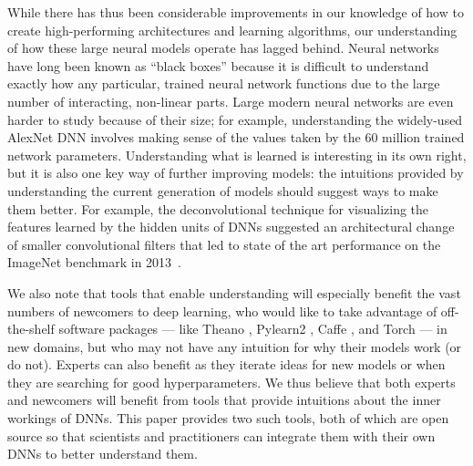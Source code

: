 \documentclass{article}
\begin{document}

While there has thus been considerable improvements in our knowledge of how to create high-performing architectures and learning algorithms, our understanding of how these large neural models operate has lagged behind. Neural networks have long been known as ``black boxes'' because it is difficult to understand exactly how any particular, trained neural network functions due to the large number of interacting, non-linear parts. Large modern neural networks are even harder to study because of their size; for example, understanding the widely-used AlexNet DNN involves making sense of the values taken by the 60 million trained network parameters. Understanding what is learned is interesting in its own right, but it is also one key way of further improving models: the intuitions provided by understanding the current generation of models should suggest ways to make them better. For example, the deconvolutional technique for visualizing the features learned by the hidden units of DNNs suggested an architectural change of smaller convolutional filters that led to state of the art performance on the ImageNet benchmark in 2013~\cite{zeiler2013visualizing-and-understanding-convolutional}.

We also note that tools that enable understanding will especially benefit the vast numbers of newcomers to deep learning, who would like to take advantage of off-the-shelf software packages --- like Theano \cite{bergstra2010theano:-a-cpu-and-gpu-math-expression}, Pylearn2 \cite{goodfellow2013pylearn2:-a-machine-learning-research}, Caffe \cite{jia2014caffe:-convolutional-architecture}, and Torch \cite{collobert-2011-torch7:-a-matlab-like-environment} --- in new domains, but who may not have any intuition for why their models work (or do not). Experts can also benefit as they iterate ideas for new models or when they are searching for good hyperparameters. We thus believe that both experts and newcomers will benefit from tools that provide intuitions about the inner workings of DNNs.  This paper provides two such tools, both of which are open source so that scientists and practitioners can integrate them with their own DNNs to better understand them. 
\end{document}
